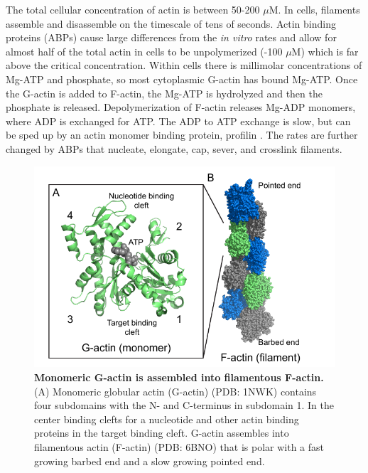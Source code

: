 The total cellular concentration of actin is between 50-200 $\mu$M. In cells, filaments assemble and disassemble on the timescale of tens of seconds. Actin binding proteins (ABPs) cause large differences from the \textit{in vitro} rates and allow for almost half of the total actin in cells to be unpolymerized (-100 $\mu$M) which is far above the critical concentration. Within cells there is millimolar concentrations of Mg-ATP and phosphate, so most cytoplasmic G-actin has bound Mg-ATP. Once the G-actin is added to F-actin, the Mg-ATP is hydrolyzed and then the phosphate is released. Depolymerization of F-actin releases Mg-ADP monomers, where ADP is exchanged for ATP. The ADP to ATP exchange is slow, but can be sped up by an actin monomer binding protein, profilin \citep{pollard_actin_2016}. The rates are further changed by ABPs that nucleate, elongate, cap, sever, and crosslink filaments. 

\begin{figure}
\centering
\includegraphics[width=17cm]{img/ch01/actin_thesis.pdf}
\caption[Monomeric G-actin is assembled into filamentous F-actin.]{\textbf{Monomeric G-actin is assembled into filamentous F-actin.} (A) Monomeric globular actin (G-actin) (PDB: 1NWK) contains four subdomains with the N- and C-terminus in subdomain 1. In the center  binding clefts for a nucleotide and other actin binding proteins in the target binding cleft. G-actin assembles into filamentous actin (F-actin) (PDB: 6BNO) that is polar with a fast growing barbed end and a slow growing pointed end.}
\label{fig:actin-structure}
\end{figure}

